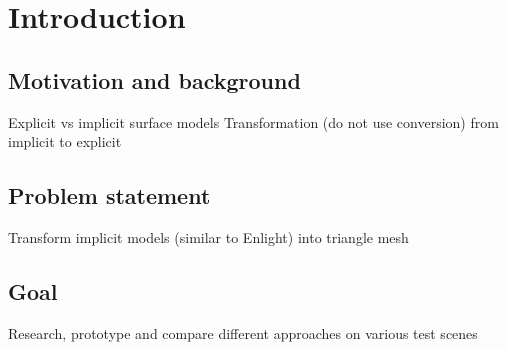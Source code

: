 \chapter{Introduction}

\section{Motivation and background}
Explicit vs implicit surface models
Transformation (do not use conversion) from implicit to explicit


\section{Problem statement}
Transform implicit models (similar to Enlight) into triangle mesh

\section{Goal}
Research, prototype and compare different approaches on various test scenes
